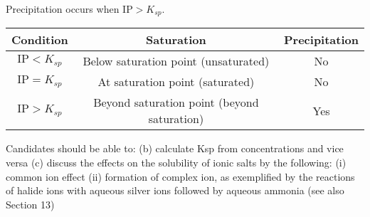 Precipitation occurs when $\text{IP}>K_{sp}$.
\begin{table}[H]
\centering
\begin{tabular}{ccc}
\hline\hline
\textbf{Condition} & \textbf{Saturation} & \textbf{Precipitation} \\
\hline
$\text{IP}<K_{sp}$ & Below saturation point (unsaturated) & No \\
$\text{IP}=K_{sp}$ & At saturation point (saturated) & No \\
$\text{IP}>K_{sp}$ & Beyond saturation point (beyond saturation) & Yes \\
\hline\hline
\end{tabular}
\end{table}


Candidates should be able to:
(b) calculate Ksp from concentrations and vice versa
(c) discuss the effects on the solubility of ionic salts by the following:
(i) common ion effect
(ii) formation of complex ion, as exemplified by the reactions of halide ions with aqueous silver ions followed by aqueous ammonia (see also Section 13)

\pagebreak